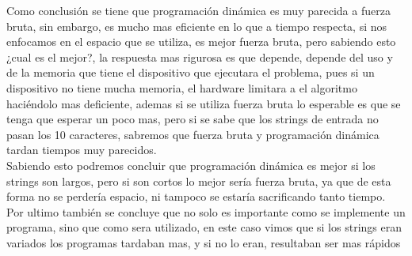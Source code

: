 Como conclusión se tiene que programación dinámica es muy parecida a fuerza bruta, sin embargo, es mucho mas eficiente en lo que a tiempo respecta, si nos enfocamos en el espacio que se utiliza, es mejor fuerza bruta, pero sabiendo esto ¿cual es el mejor?, la respuesta mas rigurosa es que depende, depende del uso y de la memoria que tiene el dispositivo que ejecutara el problema, pues si un dispositivo no tiene mucha memoria, el hardware limitara a el algoritmo haciéndolo mas deficiente, ademas si se utiliza fuerza bruta lo esperable es que se tenga que esperar un poco mas, pero si se sabe que los strings de entrada no pasan los 10 caracteres, sabremos que fuerza bruta y programación dinámica tardan tiempos muy parecidos.\\
Sabiendo esto podremos concluir que programación dinámica es mejor si los strings son largos, pero si son cortos lo mejor sería fuerza bruta, ya que de esta forma no se perdería espacio, ni tampoco se estaría sacrificando tanto tiempo.\\
Por ultimo también se concluye que no solo es importante como se implemente un programa, sino que como sera utilizado, en este caso vimos que si los strings eran variados los programas tardaban mas, y si no lo eran, resultaban ser mas rápidos

